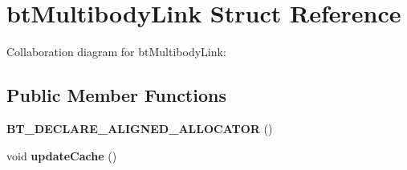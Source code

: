 \hypertarget{structbt_multibody_link}{\section{bt\+Multibody\+Link Struct Reference}
\label{structbt_multibody_link}
}


Collaboration diagram for bt\+Multibody\+Link\+:
\subsection*{Public Member Functions}
\begin{DoxyCompactItemize}
\item 
\hypertarget{structbt_multibody_link_a7f9205c013f7aa0b98caa593c633f013}{{\bfseries B\+T\+\_\+\+D\+E\+C\+L\+A\+R\+E\+\_\+\+A\+L\+I\+G\+N\+E\+D\+\_\+\+A\+L\+L\+O\+C\+A\+T\+O\+R} ()}\label{structbt_multibody_link_a7f9205c013f7aa0b98caa593c633f013}

\item 
\hypertarget{structbt_multibody_link_a2fcde56a4b2c94a9f27ddb7d0fe08e0a}{void {\bfseries update\+Cache} ()}\label{structbt_multibody_link_a2fcde56a4b2c94a9f27ddb7d0fe08e0a}

\end{DoxyCompactItemize}
